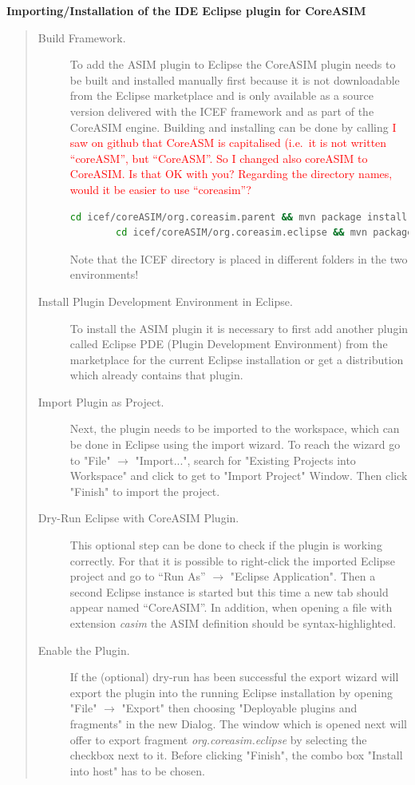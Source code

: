 \textbf{Importing/Installation of the IDE Eclipse plugin for CoreASIM}
\begin{quote}
\small
\begin{description}
	\item[Build Framework.] To add the ASIM plugin to Eclipse the CoreASIM plugin needs to be built and installed  manually first because it is not downloadable from the Eclipse marketplace and is only available as a source version delivered with the ICEF framework and as part of the CoreASIM engine. Building and installing can be done by calling
	\textcolor{red}{I saw on github that CoreASM is capitalised (i.e.\ it is not written ``coreASM'', but ``CoreASM''. So I changed also coreASIM to CoreASIM. Is that OK  with you? Regarding the directory names, would it be easier to use ``coreasim''?}
	\begin{lstlisting}[language=bash]
		cd icef/coreASIM/org.coreasim.parent && mvn package install
		cd icef/coreASIM/org.coreasim.eclipse && mvn package install\end{lstlisting}
	Note that the ICEF directory is placed in different folders in the two environments!
	
	\item[Install Plugin Development Environment in Eclipse.] To install the ASIM plugin it is necessary to first add another plugin called Eclipse PDE (Plugin Development Environment) from the marketplace for the current Eclipse installation or get a distribution which already contains that plugin.
	
	\item[Import Plugin as Project.] Next, the plugin needs to be imported to the workspace, which can be done in Eclipse using the import wizard. To reach the wizard go to "File" $\rightarrow$ "Import...", search for "Existing Projects into Workspace" and click to get to "Import Project" Window. Then click "Finish" to import the project.
	
	\item[Dry-Run Eclipse with CoreASIM Plugin.] This optional step can be done to check if the plugin is working correctly. For that it is possible to right-click the imported Eclipse project and go to ``Run As'' $\rightarrow$ "Eclipse Application". Then a second Eclipse instance is started but this time a new tab should appear named ``CoreASIM''. In addition, when opening a file with extension \textit{casim} the ASIM definition should be syntax-highlighted.

	\item[Enable the Plugin.] If the (optional) dry-run has been successful the export wizard will export the plugin into the running Eclipse installation by opening "File" $\rightarrow$  "Export" then choosing "Deployable plugins and fragments" in the new Dialog. The window which is opened next will offer to export fragment  \textit{org.coreasim.eclipse} by selecting the checkbox next to it. Before clicking "Finish", the combo box "Install into host" has to be chosen.
\end{description}
\end{quote}

